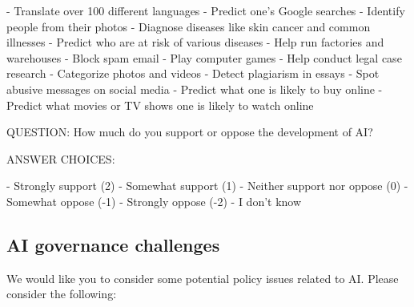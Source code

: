 \documentclass{article}
\begin{document}

-  Translate over 100 different languages
-  Predict one’s Google searches
-  Identify people from their photos
-  Diagnose diseases like skin cancer and common illnesses
-  Predict who are at risk of various diseases
-  Help run factories and warehouses
-  Block spam email
-  Play computer games
-  Help conduct legal case research
-  Categorize photos and videos
-  Detect plagiarism in essays
-  Spot abusive messages on social media
-  Predict what one is likely to buy online
-  Predict what movies or TV shows one is likely to watch online

\noindent QUESTION: How much do you support or oppose the development of AI?

\noindent ANSWER CHOICES:

-  Strongly support (2)
-  Somewhat support (1)
-  Neither support nor oppose (0)
-  Somewhat oppose (-1)
-  Strongly oppose (-2)
-  I don’t know

\subsection{AI governance challenges}

\noindent We would like you to consider some potential policy issues related to AI. Please consider the following:

\end{document}
